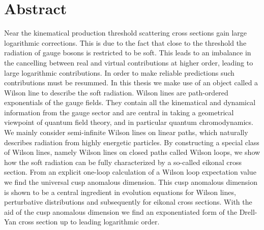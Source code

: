 \chapter*{Abstract} 
Near the kinematical production threshold scattering cross sections gain large logarithmic corrections. This is due to the fact that close to the threshold the radiation of gauge bosons is restricted to be soft. This leads to an imbalance in the cancelling between real and virtual contributions at higher order, leading to large logarithmic contributions. In order to make reliable predictions such contributions must be resummed. In this thesis we make use of an object called a Wilson line to describe the soft radiation. Wilson lines are path-ordered exponentials of the gauge fields. They contain all the kinematical and dynamical information from the gauge sector and are central in taking a geometrical viewpoint of quantum field theory, and in particular quantum chromodynamics. We mainly consider semi-infinite Wilson lines on linear paths, which naturally describes radiation from highly energetic particles. By constructing a special class of Wilson lines, namely Wilson lines on closed paths called Wilson loops, we show how the soft radiation can be fully characterized by a so-called eikonal cross section. From an explicit one-loop calculation of a Wilson loop expectation value we find the universal cusp anomalous dimension. This cusp anomalous dimension is shown to be a central ingredient in evolution equations for Wilson lines, perturbative distributions and subsequently for eikonal cross sections. With the aid of the cusp anomalous dimension we find an exponentiated form of the Drell-Yan cross section up to leading logarithmic order. 